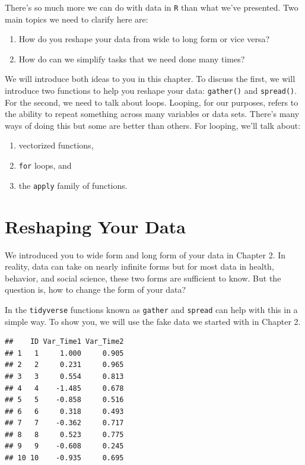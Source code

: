 \documentclass[]{tufte-book}
\providecommand{\tightlist}{%
  \setlength{\itemsep}{0pt}\setlength{\parskip}{0pt}}
\theoremstyle{definition}
\theoremstyle{definition}
\theoremstyle{remark}
\begin{document}
There's so much more we can do with data in \texttt{R} than what we've
presented. Two main topics we need to clarify here are:

\begin{enumerate}
\def\labelenumi{\arabic{enumi}.}
\tightlist
\item
  How do you reshape your data from wide to long form or vice versa?
\item
  How do can we simplify tasks that we need done many times?
\end{enumerate}

We will introduce both ideas to you in this chapter. To discuss the
first, we will introduce two functions to help you reshape your data:
\texttt{gather()} and \texttt{spread()}. For the second, we need to talk
about loops. Looping, for our purposes, refers to the ability to repeat
something across many variables or data sets. There's many ways of doing
this but some are better than others. For looping, we'll talk about:

\begin{enumerate}
\def\labelenumi{\arabic{enumi}.}
\tightlist
\item
  vectorized functions,
\item
  \texttt{for} loops, and
\item
  the \texttt{apply} family of functions.
\end{enumerate}

\section*{Reshaping Your Data}\label{reshaping-your-data}

We introduced you to wide form and long form of your data in Chapter 2.
In reality, data can take on nearly infinite forms but for most data in
health, behavior, and social science, these two forms are sufficient to
know. But the question is, how to change the form of your data?

In the \texttt{tidyverse} functions known as \texttt{gather} and
\texttt{spread} can help with this in a simple way. To show you, we will
use the fake data we started with in Chapter 2.

\begin{verbatim}
##    ID Var_Time1 Var_Time2
## 1   1     1.000     0.905
## 2   2     0.231     0.965
## 3   3     0.554     0.813
## 4   4    -1.485     0.678
## 5   5    -0.858     0.516
## 6   6     0.318     0.493
## 7   7    -0.362     0.717
## 8   8     0.523     0.775
## 9   9    -0.608     0.245
## 10 10    -0.935     0.695
\end{verbatim}
\end{document}
